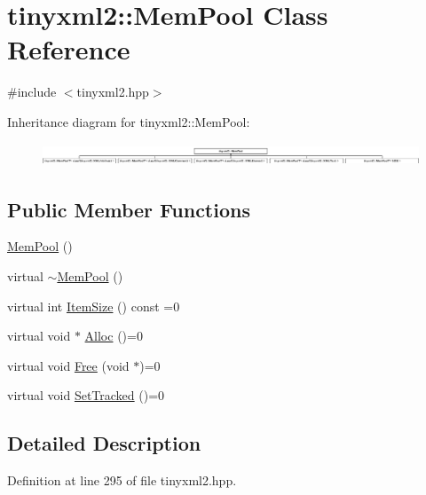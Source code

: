 \hypertarget{classtinyxml2_1_1_mem_pool}{\section{tinyxml2\-:\-:Mem\-Pool Class Reference}
\label{classtinyxml2_1_1_mem_pool}
}


{\ttfamily \#include $<$tinyxml2.\-hpp$>$}

Inheritance diagram for tinyxml2\-:\-:Mem\-Pool\-:\begin{figure}[H]
\begin{center}
\leavevmode
\includegraphics[height=0.691358cm]{classtinyxml2_1_1_mem_pool}
\end{center}
\end{figure}
\subsection*{Public Member Functions}
\begin{DoxyCompactItemize}
\item 
\hyperlink{classtinyxml2_1_1_mem_pool_a9101a0083d7370c85bd5aaaba7157f84}{Mem\-Pool} ()
\item 
virtual \hyperlink{classtinyxml2_1_1_mem_pool_ae55ad9e3faeca702e6ccbb38fdbcad72}{$\sim$\-Mem\-Pool} ()
\item 
virtual int \hyperlink{classtinyxml2_1_1_mem_pool_a0c518d49e3a94bde566f61e13b7240bb}{Item\-Size} () const =0
\item 
virtual void $\ast$ \hyperlink{classtinyxml2_1_1_mem_pool_a4f977b5fed752c0bbfe5295f469d6449}{Alloc} ()=0
\item 
virtual void \hyperlink{classtinyxml2_1_1_mem_pool_a49e3bfac2cba2ebd6776b31e571f64f7}{Free} (void $\ast$)=0
\item 
virtual void \hyperlink{classtinyxml2_1_1_mem_pool_ac5804dd1387b2e4de5eef710076a0db1}{Set\-Tracked} ()=0
\end{DoxyCompactItemize}


\subsection{Detailed Description}


Definition at line 295 of file tinyxml2.\-hpp.



